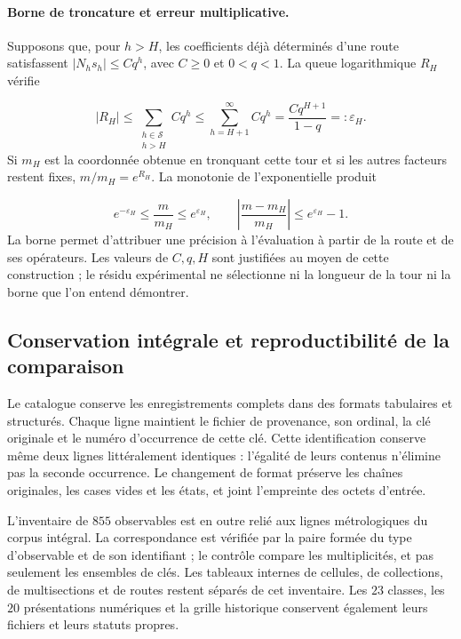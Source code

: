 \paragraph{Borne de troncature et erreur multiplicative.
}
Supposons que, pour \(h>H\), les coefficients déjà déterminés d’une
route satisfassent \(|N_hs_h|\leq Cq^h\), avec \(C\geq0\) et
\(0<q<1\). La queue logarithmique \(R_H\) vérifie

\[
 |R_H|\leq\sum_{\substack{h\in\mathcal S\\h>H}}Cq^h
 \leq\sum_{h=H+1}^{\infty}Cq^h
 =\frac{Cq^{H+1}}{1-q}=:\varepsilon_H.
\]
Si \(m_H\) est la coordonnée obtenue en tronquant cette tour et si les autres
facteurs restent fixes, \(m/m_H=e^{R_H}\). La monotonie de
l’exponentielle produit

\[
 e^{-\varepsilon_H}\leq\frac{m}{m_H}\leq e^{\varepsilon_H},
 \qquad
 \left|\frac{m-m_H}{m_H}\right|\leq e^{\varepsilon_H}-1.
\]
La borne permet d’attribuer une précision à l’évaluation à partir de la route et de ses
opérateurs. Les valeurs de \(C,q,H\) sont justifiées au moyen de cette
construction ; le résidu expérimental ne sélectionne ni la longueur de la
tour ni la borne que l’on entend démontrer.


\subsection{Conservation intégrale et reproductibilité de la comparaison
}
\label{subsec:vi-catalogo-reproducible}

Le catalogue conserve les enregistrements complets dans des formats tabulaires et
structurés. Chaque ligne maintient le fichier de provenance, son ordinal,
la clé originale et le numéro d’occurrence de cette clé. Cette
identification conserve même deux lignes littéralement identiques :
l’égalité de leurs contenus n’élimine pas la seconde occurrence. Le changement
de format préserve les chaînes originales, les cases vides et les
états, et joint l’empreinte des octets d’entrée.


L’inventaire de \(855\) observables est en outre relié aux lignes
métrologiques du corpus intégral. La correspondance est vérifiée
par la paire formée du type d’observable et de son identifiant ; le
contrôle compare les multiplicités, et pas seulement les ensembles de clés. Les tableaux
internes de cellules, de collections, de multisections et de routes restent séparés
de cet inventaire. Les \(23\) classes, les \(20\) présentations
numériques et la grille historique conservent également leurs fichiers et leurs statuts
propres.


